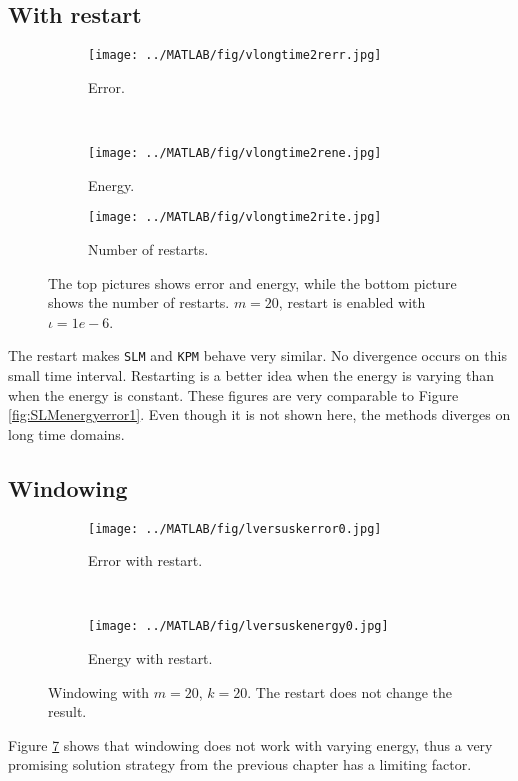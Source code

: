 \subsection{With restart} %
\begin{figure}[H]
        \centering
        \begin{subfigure}[b]{0.45\textwidth}
                \texttt{[image: ../MATLAB/fig/vlongtime2rerr.jpg]}
                \caption{ Error. }
                \label{fig:vlongtime2rerr}
        \end{subfigure}
        ~
        \begin{subfigure}[b]{0.45\textwidth}
                \texttt{[image: ../MATLAB/fig/vlongtime2rene.jpg]}
                \caption{ Energy. }
                \label{fig:vlongtime8rerr}
        \end{subfigure}
     
        
        \begin{subfigure}[b]{0.45\textwidth}
                \texttt{[image: ../MATLAB/fig/vlongtime2rite.jpg]}
                \caption{ Number of restarts. }
                \label{fig:vlongtime2rene}
        \end{subfigure}
        \caption{ The top pictures shows error and energy, while the bottom picture shows the number of restarts. $m = 20$, restart is enabled with $\iota = 1e-6$. }
        \label{fig:vSLMenergyerror1}
\end{figure}
The restart makes \texttt{SLM} and \texttt{KPM} behave very similar. No divergence occurs on this small time interval. Restarting is a better idea when the energy is varying than when the energy is constant. These figures are very comparable to Figure \ref{fig:SLMenergyerror1}. Even though it is not shown here, the methods diverges on long time domains.
\subsection{Windowing}%
\begin{figure}[H]
        \centering
        \begin{subfigure}[b]{0.45\textwidth}
                \texttt{[image: ../MATLAB/fig/lversuskerror0.jpg]}
                \caption{ Error with restart. }
                \label{fig:lversuskerror0}
        \end{subfigure}
		~
		\begin{subfigure}[b]{0.45\textwidth}
                \texttt{[image: ../MATLAB/fig/lversuskenergy0.jpg]}
                \caption{ Energy with restart. }
                \label{fig:lversuskenergy0}
        \end{subfigure}
                \caption{ Windowing with $m = 20$, $k= 20$. The restart does not change the result.}
        \label{fig:lversuskenergy}
\end{figure}
\noindent Figure \ref{fig:lversuskenergy} shows that windowing does not work with varying energy, thus a very promising solution strategy from the previous chapter has a limiting factor.\\


